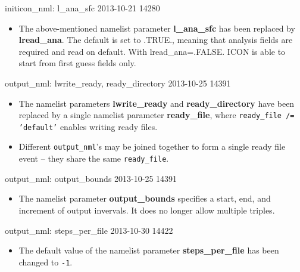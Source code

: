\begin{changeitem}{initicon\_nml: l\_ana\_sfc}{ 2013-10-21 }{ 14280 }
  \begin{itemize}
   \item The above-mentioned namelist parameter \textbf{l\_ana\_sfc} has been replaced by \textbf{lread\_ana}. The default
         is set to .TRUE., meaning that analysis fields are required and read on default. With lread\_ana=.FALSE. ICON is able to start from
         first guess fields only.
  \end{itemize}
\end{changeitem}

\begin{changeitem}{output\_nml: lwrite\_ready, ready\_directory}{ 2013-10-25 }{ 14391 }
  \begin{itemize}
   \item The namelist parameters \textbf{lwrite\_ready} and \textbf{ready\_directory} have been replaced
         by a single namelist parameter \textbf{ready\_file}, where \texttt{ready\_file /= 'default'} enables
         writing ready files.
   \item Different \texttt{output\_nml}'s may be joined together to form a single ready file event -- they
         share the same \texttt{ready\_file}.
  \end{itemize}
\end{changeitem}

\begin{changeitem}{output\_nml: output\_bounds }{ 2013-10-25 }{ 14391 }
  \begin{itemize}
   \item The namelist parameter \textbf{output\_bounds} specifies a start, end, and increment of
         output invervals.
         It does no longer allow multiple triples.
  \end{itemize}
\end{changeitem}

\begin{changeitem}{output\_nml: steps\_per\_file }{ 2013-10-30 }{ 14422 }
  \begin{itemize}
   \item The default value of the namelist parameter \textbf{steps\_per\_file} has been changed to \texttt{-1}.
  \end{itemize}
\end{changeitem}

